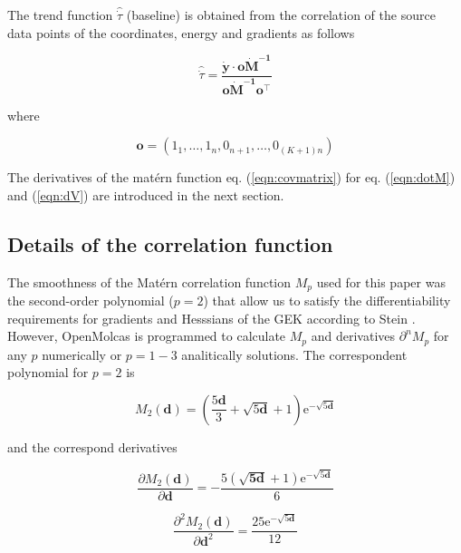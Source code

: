 \documentclass[aps,prb,twocolumn,superscriptaddress,floatfix,longbibliography,10pt]{revtex4-2}
\begin{document}
The trend function $\hat{\dot \tau}$ (baseline) is obtained from the correlation of the source data points of the coordinates, energy and gradients as follows 

\begin{equation} \label{eqn:tau}
\hat{\dot \tau} = \frac{\mathbf{\dot y} \cdot \mathbf{o}\mathbf{\dot M^{-1}}}{\mathbf{o}\mathbf{\dot M^{-1}}\mathbf{o^\intercal}}
\end{equation}

where 

\begin{equation} \label{eqn:O}
\mathbf{o} = \left(1_1,\dots,1_n,0_{n+1},\dots,0_{(K+1)n}\right)
\end{equation}

The derivatives of the mat\'ern function eq. (\ref{eqn:covmatrix}) for eq. (\ref{eqn:dotM}) and (\ref{eqn:dV}) are introduced in the next section.

\subsection{Details of the correlation function}

The smoothness of the Mat\'ern correlation function $M_p$ used for this paper was the second-order polynomial ($p = 2$) that allow us to satisfy the differentiability requirements for gradients and Hesssians of the GEK according to Stein \cite{Stein2019}. However, OpenMolcas is programmed to calculate $M_p$ and derivatives $\partial^n M_p$ for any $p$ numerically  or $p = 1-3$ analitically solutions. The correspondent polynomial for $p = 2$ is 

\begin{equation} \label{eqn:mat2p}
M_2(\mathbf{d}) = \left(\dfrac{5\mathbf{d}}{3}+\sqrt{5\mathbf{d}}+1\right)\mathrm{e}^{-\sqrt{5\mathbf{d}}}
\end{equation}

and the correspond derivatives 

\begin{equation} \label{eqn:d1mat2p}
\dfrac{\partial M_2(\mathbf{d})}{\partial \mathbf{d}} = -\dfrac{5\left(\sqrt{\mathbf{5d}}+1\right)\mathrm{e}^{-\sqrt{5\mathbf{d}}}}{6}
\end{equation}

\begin{equation} \label{eqn:d2mat2p}
\dfrac{\partial^2 M_2(\mathbf{d})}{\partial\mathbf{d}^2} = \dfrac{25\mathrm{e}^{-\sqrt{5\mathbf{d}}}}{12}
\end{equation}
\end{document}
